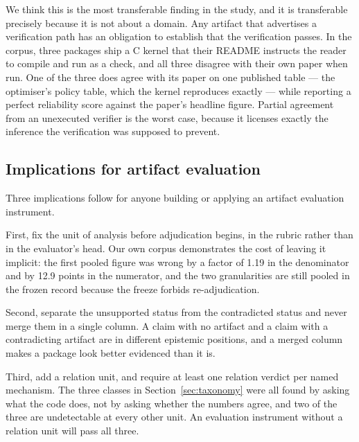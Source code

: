 \documentclass[sigconf,review]{acmart}
\begin{document}
We think this is the most transferable finding in the study, and it is
transferable precisely because it is not about a domain. Any artifact that
advertises a verification path has an obligation to establish that the
verification passes. In the corpus, three packages ship a C kernel that their
README instructs the reader to compile and run as a check, and all three
disagree with their own paper when run. One of the three does agree with its
paper on one published table --- the optimiser's policy table, which the
kernel reproduces exactly --- while reporting a perfect reliability score
against the paper's headline figure. Partial agreement from an unexecuted
verifier is the worst case, because it licenses exactly the inference the
verification was supposed to prevent.

\subsection{Implications for artifact evaluation}
\label{sec:disc-impl}

Three implications follow for anyone building or applying an artifact
evaluation instrument.

First, fix the unit of analysis before adjudication begins, in the rubric
rather than in the evaluator's head. Our own corpus demonstrates the cost of
leaving it implicit: the first pooled figure was wrong by a factor of 1.19 in
the denominator and by 12.9 points in the numerator, and the two granularities
are still pooled in the frozen record because the freeze forbids re-adjudication.

Second, separate the unsupported status from the contradicted status and never
merge them in a single column. A claim with no artifact and a claim with a
contradicting artifact are in different epistemic positions, and a merged
column makes a package look better evidenced than it is.

Third, add a relation unit, and require at least one relation verdict per
named mechanism. The three classes in Section~\ref{sec:taxonomy} were all
found by asking what the code does, not by asking whether the numbers agree,
and two of the three are undetectable at every other unit. An evaluation
instrument without a relation unit will pass all three.
\end{document}
